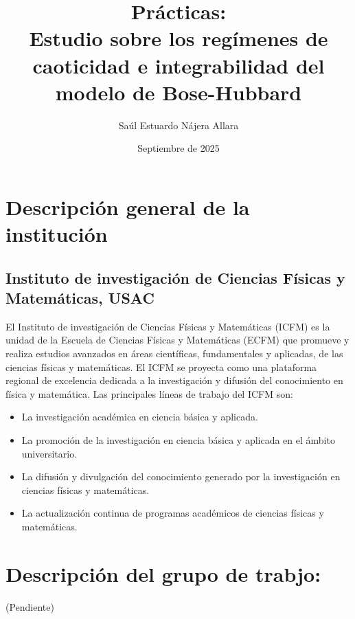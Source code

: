 \documentclass[spanish,titlepage,table]{practicas}
\institute{
    Universidad de San Carlos de Guatemala\\[.5em]
    Escuela de Ciencias Físicas y Matemáticas
}
\title{
    {\LARGE Prácticas:}\\[0.5em]
    Estudio sobre los regímenes de caoticidad e integrabilidad del modelo de Bose-Hubbard 
}
\author{Saúl Estuardo Nájera Allara}
\date{Septiembre de 2025}
\begin{document}
\maketitle

\section{Descripción general de la institución}\label{sec:institution}
\subsection{Instituto de investigación de Ciencias Físicas y Matemáticas, USAC}
El Instituto de investigación de Ciencias Físicas y Matemáticas (ICFM) es la unidad de la Escuela de Ciencias Físicas y Matemáticas (ECFM) que promueve y realiza estudios avanzados en áreas científicas, fundamentales y aplicadas, de las ciencias físicas y matemáticas. El ICFM se proyecta como una plataforma regional de excelencia dedicada a la investigación y difusión del conocimiento en física y matemática. Las principales líneas de trabajo del ICFM son:
\begin{itemize}
    \item La investigación académica en ciencia básica y aplicada.
    \item La promoción de la investigación en ciencia básica y aplicada en el ámbito universitario.
    \item La difusión y divulgación del conocimiento generado por la investigación en ciencias físicas y matemáticas.
    \item La actualización continua de programas académicos de ciencias físicas y matemáticas.
\end{itemize}
\section{Descripción del grupo de trabjo:}
(Pendiente)
\end{document}
